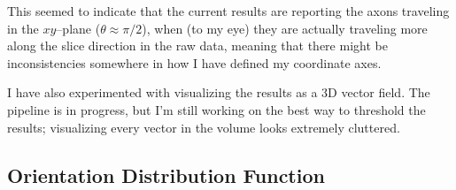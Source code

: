 \documentclass[11pt]{article}
\begin{document}
This seemed to indicate that the current results are reporting the axons
traveling in the $xy$--plane ($\theta\approx\pi/2$), when (to my eye) they are
actually traveling more along the slice direction in the raw data, meaning that
there might be inconsistencies somewhere in how I have defined my coordinate
axes.
 
I have also experimented with visualizing the results as a 3D vector field.  The
pipeline is in progress, but I'm still working on the best way to threshold the
results; visualizing every vector in the volume looks extremely cluttered.

\subsection{Orientation Distribution Function}
\end{document}
